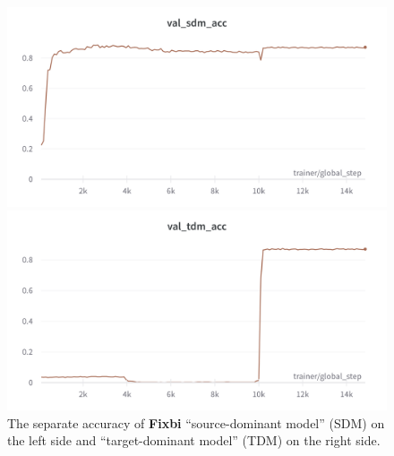 \begin{figure}[h]
  \centering
  \begin{minipage}[b]{0.49\textwidth}
    \includegraphics[width=\textwidth]{Figures/Results/fixbi_sdm.png}
  \end{minipage}
  \hfill
  \begin{minipage}[b]{0.49\textwidth}
    \includegraphics[width=\textwidth]{Figures/Results/fixbi_tdm.png}
  \end{minipage}
  \caption{The separate accuracy of \textbf{Fixbi} “source-dominant model” (SDM) on the left side and “target-dominant model” (TDM) on the right side.}
  \label{fig:sdm_tdm}
\end{figure}


